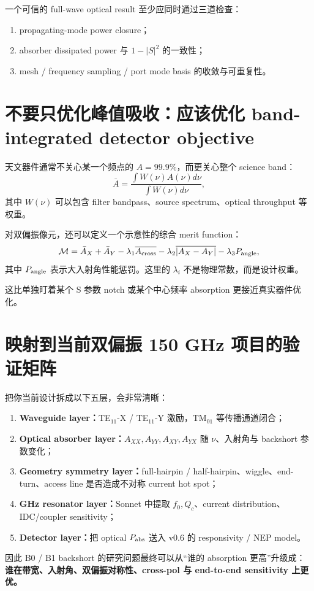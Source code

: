 \documentclass[11pt,a4paper,openany]{ctexrep}
\begin{document}
\begin{checkpointbox}
一个可信的 full-wave optical result 至少应同时通过三道检查：
\begin{enumerate}
  \item propagating-mode power closure；
  \item absorber dissipated power 与 $1-|S|^2$ 的一致性；
  \item mesh / frequency sampling / port mode basis 的收敛与可重复性。
\end{enumerate}
\end{checkpointbox}

\section{不要只优化峰值吸收：应该优化 band-integrated detector objective}

天文器件通常不关心某一个频点的 $A=99.9\%$，而更关心整个 science band：
\[
\bar A=\frac{\int W(\nu)A(\nu)d\nu}{\int W(\nu)d\nu},
\]
其中 $W(\nu)$ 可以包含 filter bandpass、source spectrum、optical throughput 等权重。

对双偏振像元，还可以定义一个示意性的综合 merit function：
\[
\mathcal M=
\bar A_X+\bar A_Y
-\lambda_1\overline{A_{\rm cross}}
-\lambda_2\overline{|A_X-A_Y|}
-\lambda_3 P_{\rm angle},
\]
其中 $P_{\rm angle}$ 表示大入射角性能惩罚。这里的 $\lambda_i$ 不是物理常数，而是设计权重。

这比单独盯着某个 S 参数 notch 或某个中心频率 absorption 更接近真实器件优化。

\section{映射到当前双偏振 150 GHz 项目的验证矩阵}

\begin{projectbox}
把你当前设计拆成以下五层，会非常清晰：
\begin{enumerate}
  \item \textbf{Waveguide layer：}TE$_{11}$-X / TE$_{11}$-Y 激励，TM$_{01}$ 等传播通道闭合；
  \item \textbf{Optical absorber layer：}$A_{XX},A_{YY},A_{XY},A_{YX}$ 随 $\nu$、入射角与 backshort 参数变化；
  \item \textbf{Geometry symmetry layer：}full-hairpin / half-hairpin、wiggle、end-turn、access line 是否造成不对称 current hot spot；
  \item \textbf{GHz resonator layer：}Sonnet 中提取 $f_0,Q_c$、current distribution、IDC/coupler sensitivity；
  \item \textbf{Detector layer：}把 optical $P_{\rm abs}$ 送入 v0.6 的 responsivity / NEP model。
\end{enumerate}
因此 B0 / B1 backshort 的研究问题最终可以从“谁的 absorption 更高”升级成：\textbf{谁在带宽、入射角、双偏振对称性、cross-pol 与 end-to-end sensitivity 上更优。}
\end{projectbox}
\end{document}
